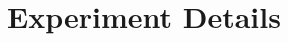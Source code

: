 \documentclass[11pt]{article}
\begin{document}
\section{Experiment Details}
\label{sec: appendix_experiment}


     


    



    
\end{document}
